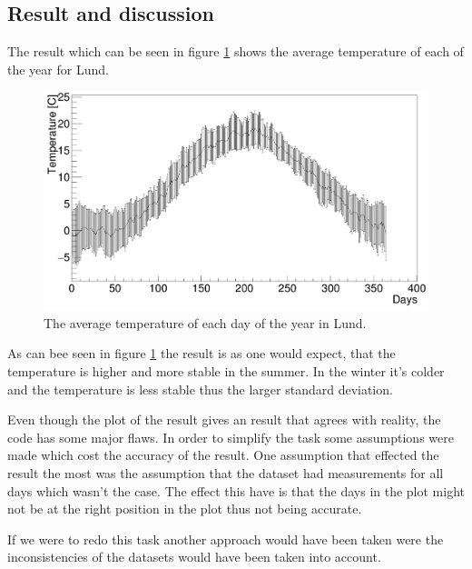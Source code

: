 \documentclass[12pt]{article}
\begin{document}
\subsection{Result and discussion}
The result which can be seen in figure \ref{avgtemp} shows the average temperature of each of the year for Lund.

\begin{figure}[H]
\includegraphics[scale = 0.2]{avg_temp.png}
\caption{The average temperature of each day of the year in Lund.}
\label{avgtemp}
\end{figure}


As can bee seen in figure \ref{avgtemp} the result is as one would expect, that the temperature is higher and more stable in the summer. In the winter it's colder and the temperature is less stable thus the larger standard deviation.

Even though the plot of the result gives an result that agrees with reality, the code has some major flaws. In order to simplify the task some assumptions were made which cost the accuracy of the result. One assumption that effected the result the most was the assumption that the dataset had measurements for all days which wasn't the case. The effect this have is that the days in the plot might not be at the right position in the plot thus not being accurate.

If we were to redo this task another approach would have been taken were the inconsistencies of the datasets would have been taken into account.
\end{document}
